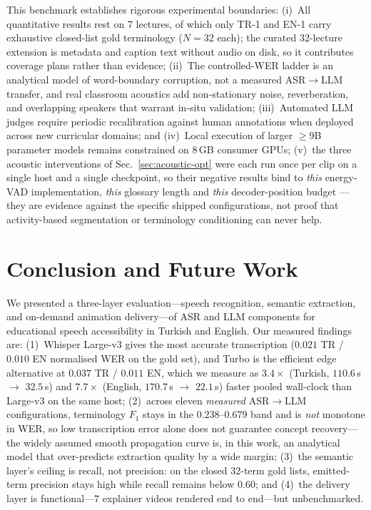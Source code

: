 \documentclass[conference]{IEEEtran}
\begin{document}
This benchmark establishes rigorous experimental boundaries: (i)~All quantitative results rest on $7$ lectures, of which only TR-1 and EN-1 carry exhaustive closed-list gold terminology ($N=32$ each); the curated $32$-lecture extension is metadata and caption text without audio on disk, so it contributes coverage plans rather than evidence; (ii)~The controlled-WER ladder is an analytical model of word-boundary corruption, not a measured ASR$\to$LLM transfer, and real classroom acoustics add non-stationary noise, reverberation, and overlapping speakers that warrant in-situ validation; (iii)~Automated LLM judges require periodic recalibration against human annotations when deployed across new curricular domains; and (iv)~Local execution of larger $\ge$9B parameter models remains constrained on 8\,GB consumer GPUs; (v)~the three acoustic interventions of Sec.~\ref{sec:acoustic-opt} were each run once per clip on a single host and a single checkpoint, so their negative results bind to \emph{this} energy-VAD implementation, \emph{this} glossary length and \emph{this} decoder-position budget --- they are evidence against the specific shipped configurations, not proof that activity-based segmentation or terminology conditioning can never help.

\section{Conclusion and Future Work}

We presented a three-layer evaluation---speech recognition, semantic extraction, and on-demand animation delivery---of ASR and LLM components for educational speech accessibility in Turkish and English. Our measured findings are: (1)~Whisper Large-v3 gives the most accurate transcription ($0.021$ TR / $0.010$ EN normalised WER on the gold set), and Turbo is the efficient edge alternative at $0.037$ TR / $0.011$ EN, which we measure as $3.4\times$ (Turkish, $110.6$\,s $\rightarrow$ $32.5$\,s) and $7.7\times$ (English, $170.7$\,s $\rightarrow$ $22.1$\,s) faster pooled wall-clock than Large-v3 on the same host; (2)~across eleven \emph{measured} ASR$\to$LLM configurations, terminology $F_1$ stays in the $0.238$--$0.679$ band and is \emph{not} monotone in WER, so low transcription error alone does not guarantee concept recovery---the widely assumed smooth propagation curve is, in this work, an analytical model that over-predicts extraction quality by a wide margin; (3)~the semantic layer's ceiling is recall, not precision: on the closed 32-term gold lists, emitted-term precision stays high while recall remains below $0.60$; and (4)~the delivery layer is functional---$7$ explainer videos rendered end to end---but unbenchmarked.
\end{document}
